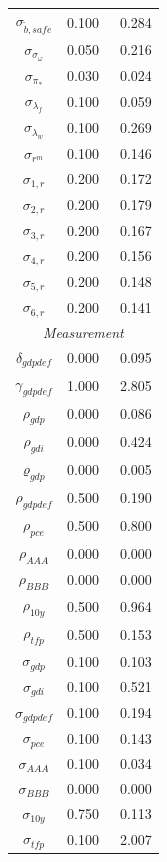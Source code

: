 \documentclass[12pt]{article}
\begin{document}
\begin{longtable}{ccc}
$ \sigma_{\tilde{b}, safe}$ &    0.100 & \   0.284 \\
$ \sigma_{\sigma_\omega}$ &    0.050 & \   0.216 \\
$ \sigma_{\pi_*}$ &    0.030 & \   0.024 \\
$ \sigma_{\lambda_f}$ &    0.100 & \   0.059 \\
$ \sigma_{\lambda_w}$ &    0.100 & \   0.269 \\
$ \sigma_{r^m}$ &    0.100 & \   0.146 \\
$ \sigma_{1,r}$ &    0.200 & \   0.172 \\
$ \sigma_{2,r}$ &    0.200 & \   0.179 \\
$ \sigma_{3,r}$ &    0.200 & \   0.167 \\
$ \sigma_{4,r}$ &    0.200 & \   0.156 \\
$ \sigma_{5,r}$ &    0.200 & \   0.148 \\
$ \sigma_{6,r}$ &    0.200 & \   0.141 \\
\multicolumn{7}{c}{\textit{Measurement}} \\[3pt]
$ \delta_{gdpdef}$ &    0.000 & \   0.095 \\
$ \gamma_{gdpdef}$ &    1.000 & \   2.805 \\
$ \rho_{gdp}$ &    0.000 & \   0.086 \\
$ \rho_{gdi}$ &    0.000 & \   0.424 \\
$ \varrho_{gdp}$ &    0.000 & \   0.005 \\
$ \rho_{gdpdef}$ &    0.500 & \   0.190 \\
$ \rho_{pce}$ &    0.500 & \   0.800 \\
$ \rho_{AAA}$ &    0.000 & \   0.000 \\
$ \rho_{BBB}$ &    0.000 & \   0.000 \\
$ \rho_{10y}$ &    0.500 & \   0.964 \\
$ \rho_{tfp}$ &    0.500 & \   0.153 \\
$ \sigma_{gdp}$ &    0.100 & \   0.103 \\
$ \sigma_{gdi}$ &    0.100 & \   0.521 \\
$ \sigma_{gdpdef}$ &    0.100 & \   0.194 \\
$ \sigma_{pce}$ &    0.100 & \   0.143 \\
$ \sigma_{AAA}$ &    0.100 & \   0.034 \\
$ \sigma_{BBB}$ &    0.000 & \   0.000 \\
$ \sigma_{10y}$ &    0.750 & \   0.113 \\
$ \sigma_{tfp}$ &    0.100 & \   2.007 \\
\end{longtable}
\end{document}
